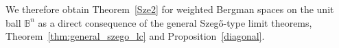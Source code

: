 \documentclass{amsart}
\newtheorem{cor}[thm]{Corollary}
\theoremstyle{definition}
\theoremstyle{remark}
\numberwithin{equation}{section}
\newcommand{\ip}[2]{\left\langle {#1} , {#2} \right\rangle} %
\newcommand{\norm}[1]{\left\lVert #1 \right\rVert} %
\begin{document}
\medskip

\noindent
We therefore obtain Theorem~\ref{Sze2} for weighted Bergman spaces on the unit ball $\mathbb{B}^n$
as a direct consequence of the general Szeg\H{o}-type limit theorems, Theorem~\ref{thm:general_szego_lc} and
Proposition~\ref{diagonal}.

\end{document}
